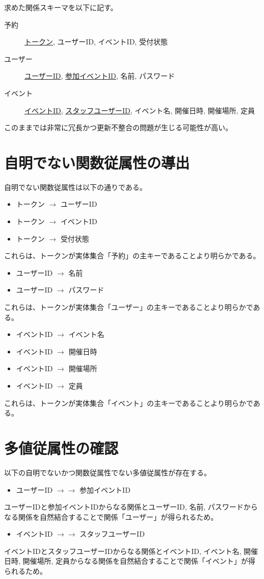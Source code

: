 \documentclass[dvipdfmx]{jarticle}
\begin{document}
求めた関係スキーマを以下に記す。

\begin{description}
  \item[予約] \underline{トークン}, ユーザーID, イベントID, 受付状態
  \item[ユーザー] \underline{ユーザーID}, \underline{参加イベントID}, 名前, パスワード
  \item[イベント] \underline{イベントID}, \underline{スタッフユーザーID}, イベント名, 開催日時, 開催場所, 定員 
\end{description}

このままでは非常に冗長かつ更新不整合の問題が生じる可能性が高い。

\section{自明でない関数従属性の導出}
自明でない関数従属性は以下の通りである。
\begin{itemize}
  \item {トークン} $\rightarrow$ {ユーザーID}
  \item {トークン} $\rightarrow$ {イベントID}
  \item {トークン} $\rightarrow$ {受付状態}
\end{itemize}
これらは、トークンが実体集合「予約」の主キーであることより明らかである。
\begin{itemize}
  \item {ユーザーID} $\rightarrow$ {名前}
  \item {ユーザーID} $\rightarrow$ {パスワード}
\end{itemize}
これらは、トークンが実体集合「ユーザー」の主キーであることより明らかである。
\begin{itemize}
  \item {イベントID} $\rightarrow$ {イベント名}
  \item {イベントID} $\rightarrow$ {開催日時}
  \item {イベントID} $\rightarrow$ {開催場所}
  \item {イベントID} $\rightarrow$ {定員}
\end{itemize}
これらは、トークンが実体集合「イベント」の主キーであることより明らかである。

\section{多値従属性の確認}
以下の自明でないかつ関数従属性でない多値従属性が存在する。
\begin{itemize}
  \item {ユーザーID} $\rightarrow \rightarrow$ {参加イベントID}
\end{itemize}
ユーザーIDと参加イベントIDからなる関係とユーザーID, 名前, パスワードからなる関係を自然結合することで関係「ユーザー」が得られるため。
\begin{itemize}
  \item {イベントID} $\rightarrow \rightarrow$ {スタッフユーザーID}
\end{itemize}
イベントIDとスタッフユーザーIDからなる関係とイベントID, イベント名, 開催日時, 開催場所, 定員からなる関係を自然結合することで関係「イベント」が得られるため。
\end{document}
